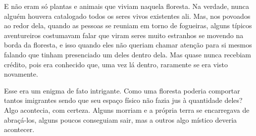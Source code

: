 E não eram só plantas e animais que viviam naquela floresta. Na verdade, nunca alguém houvera catalogado todos os seres vivos existentes ali. Mas, nos povoados ao redor dela, quando as pessoas se reuniam em torno de fogueiras, alguns típicos aventureiros costumavam falar que viram seres muito estranhos se movendo na borda da floresta, e isso quando eles não queriam chamar atenção para si mesmos falando que tinham presenciado um deles dentro dela. Mas quase nunca recebiam crédito, pois era conhecido que, uma vez lá dentro, raramente se era visto novamente.

Esse era um enigma de fato intrigante. Como uma floresta poderia comportar tantos imigrantes sendo que seu espaço físico não fazia jus à quantidade deles? Algo acontecia, com certeza. Alguns morriam e a própria terra se encarregava de abraçá-los, alguns poucos conseguiam sair, mas a outros algo místico deveria acontecer.